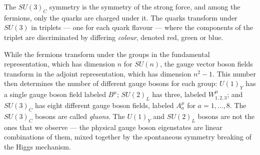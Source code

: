 \documentclass[twoside,english]{uiofysmaster}
\begin{document}
The $SU(3)_C$ symmetry is the symmetry of the strong force, and among the fermions, only the quarks are charged under it. The quarks transform under $SU(3)$ in triplets --- one for each quark flavour --- where the components of the triplet are discriminated by differing {\it colour}, denoted red, green or blue. 


While the fermions transform under the groups in the fundamental representation, which has dimension $n$ for $SU(n)$, the gauge vector boson fields transform in the adjoint representation, which has dimension $n^2-1$. This number then determines the number of different gauge bosons for each group: $U(1)_Y$ has a single gauge boson field labeled $B^\mu$; $SU(2)_L$ has three, labeled $W^\mu_{1,2,3}$; and $SU(3)_C$ has eight different gauge boson fields, labeled $A^\mu_a$ for $a = 1,...,8$. The $SU(3)_C$ bosons are called {\it gluons}. The $U(1)_Y$ and $SU(2)_L$ bosons are not the ones that we observe --- the physical gauge boson eigenstates are linear combinations of them, mixed together by the spontaneous symmetry breaking of the Higgs mechanism.
\end{document}

